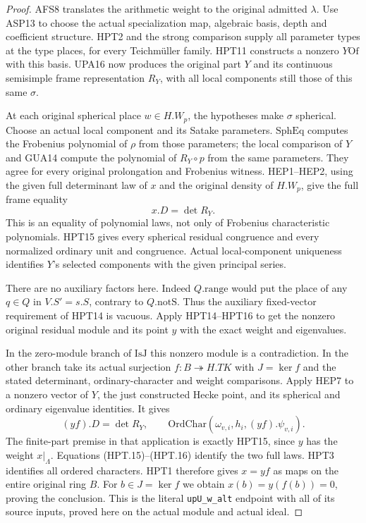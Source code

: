 \begin{proof}
AFS8 translates the arithmetic weight to the original admitted
$\lambda$.  Use ASP13 to choose the actual specialization map,
algebraic basis, depth and coefficient structure.  HPT2 and the
strong comparison supply all parameter types at the type places,
for every Teichm\"uller family.  HPT11 constructs a nonzero
$Y\mathrm{Of}$ with this basis.  UPA16 now produces the original
part $Y$ and its continuous semisimple frame representation $R_Y$,
with all local components still those of this same $\sigma$.

At each original spherical place $w\in H.W_p$, the hypotheses
make $\sigma$ spherical.  Choose an actual local component and
its Satake parameters.  $\mathrm{SphEq}$ computes the Frobenius
polynomial of $\rho$ from those parameters; the local comparison
of $Y$ and GUA14 compute the polynomial of $R_Y\circ p$ from
the same parameters.  They agree for every original prolongation
and Frobenius witness.  HEP1--HEP2, using the given full determinant
law of $x$ and the original density of $H.W_p$, give the full
frame equality
\[
                              x.D=\det R_Y.                    \tag{HPT.15}
\]
This is an equality of polynomial laws, not only of Frobenius
characteristic polynomials.  HPT15 gives every spherical residual
congruence and every normalized ordinary unit and congruence.
Actual local-component uniqueness identifies $Y$'s selected
components with the given principal series.

There are no auxiliary factors here.  Indeed $Q.\mathrm{range}$
would put the place of any $q\in Q$ in $V.S'=s.S$, contrary
to $Q.\mathrm{notS}$.  Thus the auxiliary fixed-vector requirement
of HPT14 is vacuous.  Apply HPT14--HPT16 to get the nonzero
original residual module and its point $y$ with the exact
weight and eigenvalues.

In the zero-module branch of $\mathrm{IsJ}$ this nonzero module
is a contradiction.  In the other branch take its actual
surjection $f:B\twoheadrightarrow H.TK$ with $J=\ker f$ and
the stated determinant, ordinary-character and weight comparisons.
Apply HEP7 to a nonzero vector of $Y$, the just constructed
Hecke point, and its spherical and ordinary eigenvalue identities.
It gives
\[
                (yf).D=\det R_Y,\qquad
       \mathrm{OrdChar}(\omega_{v,i},h_i,(yf).\psi_{v,i}).       \tag{HPT.16}
\]
The finite-part premise in that application is exactly HPT15,
since $y$ has the weight $x|_\Lambda$.  Equations
(HPT.15)--(HPT.16) identify the two full laws.  HPT3 identifies
all ordered characters.  HPT1 therefore gives $x=yf$ as maps on
the entire original ring $B$.  For $b\in J=\ker f$ we obtain
$x(b)=y(f(b))=0$, proving the conclusion.  This is the literal
\texttt{upU\_w\_alt} endpoint with all of its source inputs,
proved here on the actual module and actual ideal.
\end{proof}

